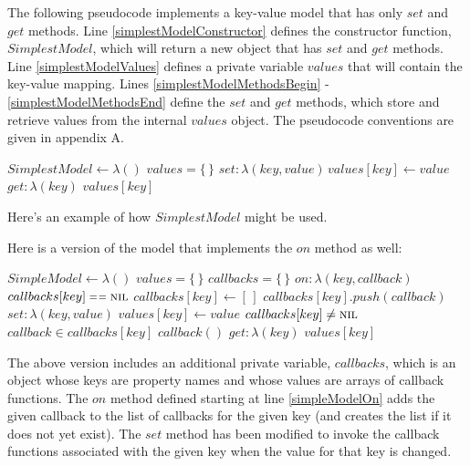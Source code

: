 The following pseudocode implements a key-value model that has only $set$ and $get$ methods. Line \ref{simplestModelConstructor} defines the constructor function, $SimplestModel$, which will return a new object that has $set$ and $get$ methods. Line \ref{simplestModelValues} defines a private variable $values$ that will contain the key-value mapping. Lines \ref{simplestModelMethodsBegin} - \ref{simplestModelMethodsEnd} define the $set$ and $get$ methods, which store and retrieve values from the internal $values$ object. The pseudocode conventions are given in appendix A.

\begin{codebox}
\li $SimplestModel \gets \lambda()$ \label{simplestModelConstructor}
\Do
  \li $values = \{\,\}$ \label{simplestModelValues}
  \li \Return \label{simplestModelMethodsBegin}
  \Do
    \li $set: \lambda(key, value) \, values[key] \gets value$
    \li $get: \lambda(key)$ \Return $values[key]$ \label{simplestModelMethodsEnd}
  \End
\End
\end{codebox}

Here's an example of how $SimplestModel$ might be used.


Here is a version of the model that implements the $on$ method as well:

\begin{codebox}
\li $SimpleModel \gets \lambda()$ \label{simpleModelConstructor}
\Do
  \li $values = \{\,\}$ \label{simpleModelValues}
  \li $callbacks = \{\,\}$ \label{simpleModelCallbacks}
  \li \Return \label{simpleModelMethodsBegin}
  \Do
    \li $on: \lambda(key, callback)$ \label{simpleModelOn}
    \Do
      \li \If $callbacks[key] \isequal \const{nil}$
      \Do
        \li $callbacks[key] \gets [\,]$
      \End
      \li $callbacks[key].push(callback)$
    \End
    \li $set: \lambda(key, value)$
    \Do
      \li $values[key] \gets value$
      \li \If $callbacks[key] \neq \textnormal{\scshape nil}$
      \Do
        \li \For $callback \in callbacks[key]$
        \Do
          \li $callback()$
        \End  
      \End
    \End
    \li $get: \lambda(key)$ \Return $values[key]$
  \End
\End
\end{codebox}

The above version includes an additional private variable, $callbacks$, which is an object whose keys are property names and whose values are arrays of callback functions. The $on$ method defined starting at line \ref{simpleModelOn} adds the given callback to the list of callbacks for the given key (and creates the list if it does not yet exist). The $set$ method has been modified to invoke the callback functions associated with the given key when the value for that key is changed.

